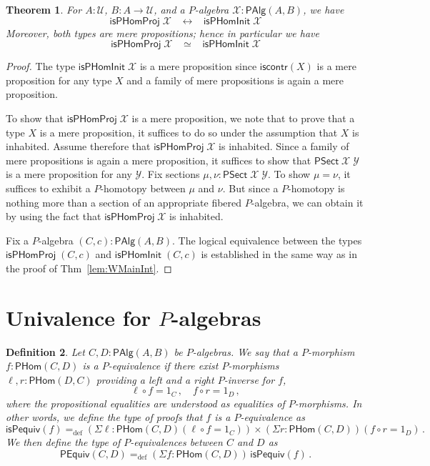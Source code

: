 \documentclass[10pt,a4paper,oneside,reqno]{amsart}
\numberwithin{equation}{section}
\theoremstyle{mythm}
\newtheorem{theorem}{Theorem}[section]
\theoremstyle{mydef}
\newtheorem{definition}[theorem]{Definition}
\theoremstyle{myrmk}
\newcommand{\ie}{\text{i.e.\ }}
\newcommand{\myemph}[1]{\textit{#1}}
\newcommand{\defeq}{=_{\mathrm{def}}}
\newcommand{\co}{\colon}
\newcommand{\iscontr}{\mathsf{iscontr}}
\newcommand{\U}{\mathcal{U}}
\newcommand{\WAlg}{\mathsf{PAlg}}
\newcommand{\WHom}{\mathsf{PHom}}
\newcommand{\WFibHom}{\mathsf{PSect}}
\newcommand{\IsWHInit}{\mathsf{isPHomInit}}
\newcommand{\IsWHProj}{\mathsf{isPHomProj}}
\newcommand{\X}{\mathcal{X}}
\newcommand{\Y}{\mathcal{Y}}
\begin{document}
\begin{theorem}\label{lem:WMainInternal}
For $A:\U$, $B : A \to \U$, and a $P$-algebra $\X : \WAlg(A,B)$, we have
\[ \IsWHProj \; \X \;\;\; \leftrightarrow \;\;\; \IsWHInit \; \X \]
Moreover, both types are mere propositions; hence in particular we have
\[ \IsWHProj \; \X \;\;\; \simeq \;\;\; \IsWHInit \; \X \]
\end{theorem}
\begin{proof}
The type $\IsWHInit \; \X$ is a mere proposition since $\iscontr(X)$ is a mere proposition for any type $X$ and a family of mere propositions is again a mere proposition.

To show that $\IsWHProj \; \X$ is a mere proposition, we note that to prove that a type $X$ is a mere proposition, it suffices to do so under the assumption that $X$ is inhabited. Assume therefore that $\IsWHProj \; \X$ is inhabited. Since a family of mere propositions is again a mere proposition, it suffices to show that $\WFibHom \; \X \; \Y$ is a mere proposition for any $\Y$. Fix sections $\mu, \nu : \WFibHom \; \X \; \Y$. To show $\mu = \nu$, it suffices to exhibit a $P$-homotopy between $\mu$ and $\nu$. But since a $P$-homotopy is nothing more than a section of an appropriate fibered $P$-algebra, we can obtain it by using the fact that $\IsWHProj \; \X$ is inhabited.

Fix a $P$-algebra $(C,c) : \WAlg(A,B)$. The logical equivalence between the types $\IsWHProj \; (C,c)$ and $\IsWHInit \; (C,c)$ is established in the same way as in the proof of Thm~\ref{lem:WMainInt}. 
\end{proof}


\section{Univalence for $P$-algebras}

\begin{definition} Let $C,D : \WAlg(A,B)$ be $P$-algebras. We say that a $P$-morphism $f \co \WHom(C,D)$ is a \myemph{$P$-equivalence}
if there exist $P$-morphisms $\ell,r \co \WHom(D,C)$ providing a left and a right $P$-inverse for $f$, \ie 
\[ 
\ell \circ f = 1_C \, , \quad f \circ r = 1_D \, ,
\]
where the propositional equalities are understood as equalities of $P$-morphisms. In other words, we define the type of proofs that $f$ is a $P$-equivalence as
\[
\mathsf{isPequiv}(f) \defeq   ( \Sigma \ell : \WHom(C,D) ( \ell \circ f = 1_C )) \times 
    (\Sigma r : \WHom(C, D))(  f \circ r = 1_D ) \, .
\]
We then define the type of \emph{$P$-equivalences} between $C$ and $D$ as
\[
\mathsf{PEquiv}(C, D)
\defeq    (\Sigma f : \WHom(C,D)) \, \mathsf{isPequiv}(f)  \, . 
\] 
\end{definition}
\end{document}
